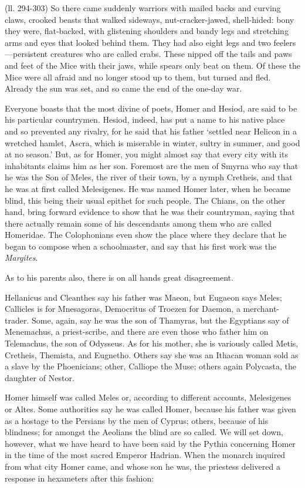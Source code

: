 (ll. 294-303) So there came suddenly warriors with mailed backs and curving
claws, crooked beasts that walked sideways, nut-cracker-jawed, shell-hided:
bony they were, flat-backed, with glistening shoulders and bandy legs and
stretching arms and eyes that looked behind them. They had also eight legs and
two feelers—persistent creatures who are called crabs. These nipped off
the tails and paws and feet of the Mice with their jaws, while spears only beat
on them. Of these the Mice were all afraid and no longer stood up to them, but
turned and fled. Already the sun was set, and so came the end of the one-day
war.


Everyone boasts that the most divine of poets, Homer and Hesiod, are said to be
his particular countrymen. Hesiod, indeed, has put a name to his native place
and so prevented any rivalry, for he said that his father ‘settled near
Helicon in a wretched hamlet, Ascra, which is miserable in winter, sultry in
summer, and good at no season.’ But, as for Homer, you might almost say
that every city with its inhabitants claims him as her son. Foremost are the
men of Smyrna who say that he was the Son of Meles, the river of their town, by
a nymph Cretheis, and that he was at first called Melesigenes. He was named
Homer later, when he became blind, this being their usual epithet for such
people. The Chians, on the other hand, bring forward evidence to show that he
was their countryman, saying that there actually remain some of his descendants
among them who are called Homeridae. The Colophonians even show the place where
they declare that he began to compose when a schoolmaster, and say that his
first work was the \emph{Margites}.

As to his parents also, there is on all hands great disagreement.

Hellanicus and Cleanthes say his father was Maeon, but Eugaeon says Meles;
Callicles is for Mnesagoras, Democritus of Troezen for Daemon, a
merchant-trader. Some, again, say he was the son of Thamyras, but the Egyptians
say of Menemachus, a priest-scribe, and there are even those who father him on
Telemachus, the son of Odysseus. As for his mother, she is variously called
Metis, Cretheis, Themista, and Eugnetho. Others say she was an Ithacan woman
sold as a slave by the Phoenicians; other, Calliope the Muse; others again
Polycasta, the daughter of Nestor.

Homer himself was called Meles or, according to different accounts, Melesigenes
or Altes. Some authorities say he was called Homer, because his father was
given as a hostage to the Persians by the men of Cyprus; others, because of his
blindness; for amongst the Aeolians the blind are so called. We will set down,
however, what we have heard to have been said by the Pythia concerning Homer in
the time of the most sacred Emperor Hadrian. When the monarch inquired from
what city Homer came, and whose son he was, the priestess delivered a response
in hexameters after this fashion:

